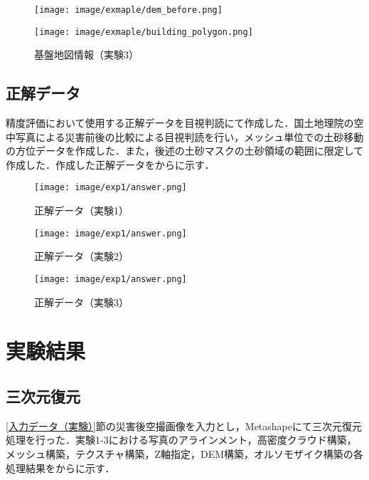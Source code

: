       \begin{figure}[tbp]
        \begin{minipage}[c]{0.5\hsize}
          \centering
          \texttt{[image: image/exmaple/dem\_before.png]}
        \end{minipage}
        \begin{minipage}[c]{0.5\hsize}
          \centering
          \texttt{[image: image/exmaple/building\_polygon.png]}
        \end{minipage}
        \caption{基盤地図情報（実験3）}
        \label{基盤地図情報（実験3）}
      \end{figure}


    \subsection*{正解データ}
      精度評価において使用する正解データを目視判読にて作成した．国土地理院の空中写真による災害前後の比較\cite{国土地理院空撮画像1, 国土地理院空撮画像2}による目視判読を行い，メッシュ単位での土砂移動の方位データを作成した．また，後述の土砂マスクの土砂領域の範囲に限定して作成した．作成した正解データをからに示す．

      \begin{figure}[tbp]
        \centering
        \texttt{[image: image/exp1/answer.png]}
        \caption{正解データ（実験1）}
        \label{正解データ（実験1）}
      \end{figure}

      \begin{figure}[tbp]
        \centering
        \texttt{[image: image/exp1/answer.png]}
        \caption{正解データ（実験2）}
      \end{figure}

      \begin{figure}[tbp]
        \centering
        \texttt{[image: image/exp1/answer.png]}
        \caption{正解データ（実験3）}
        \label{正解データ（実験3）}
      \end{figure}


  \section{実験結果}
    \label{実験結果}
    \subsection*{三次元復元}
      \ref{入力データ（実験）}節の災害後空撮画像を入力とし，Metashapeにて三次元復元処理を行った．実験1-3における写真のアラインメント，高密度クラウド構築，メッシュ構築，テクスチャ構築，Z軸指定，DEM構築，オルソモザイク構築の各処理結果をからに示す．

